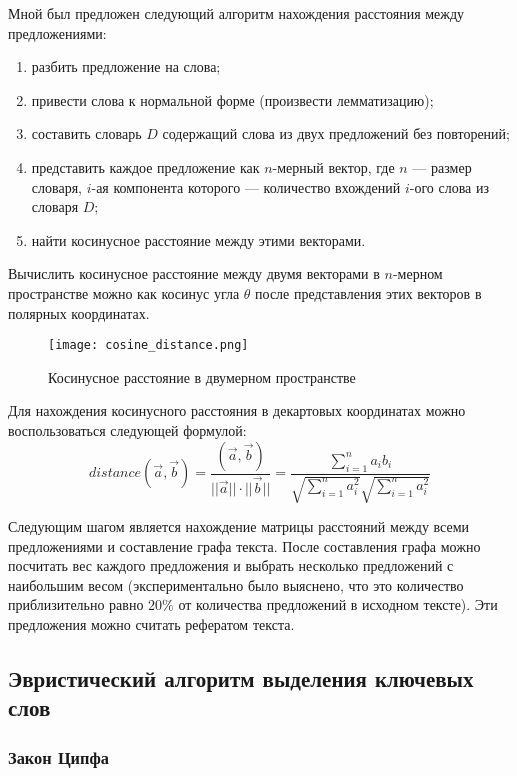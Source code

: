 Мной был предложен следующий алгоритм нахождения расстояния между предложениями:
\begin{enumerate}
    \item разбить предложение на слова;
    \item привести слова к нормальной форме (произвести лемматизацию);
    \item составить словарь $D$ содержащий слова из двух предложений без повторений;
    \item представить каждое предложение как $n$-мерный вектор, где $n$ --- размер словаря, $i$-ая компонента которого --- количество вхождений $i$-ого слова из словаря $D$;
    \item найти косинусное расстояние между этими векторами.
\end{enumerate} 

Вычислить косинусное расстояние между двумя векторами в $n$-мерном пространстве можно как косинус угла $\theta$ после представления этих векторов в полярных координатах.

\begin{figure}[H]
\centering
\texttt{[image: cosine\_distance.png]}
\caption{Косинусное расстояние в двумерном пространстве}
\label{fig:cosine}
\end{figure}

Для нахождения косинусного расстояния в декартовых координатах можно воспользоваться следующей формулой:
\begin{equation}
distance(\vec{a}, \vec{b}) = \dfrac{(\vec{a}, \vec{b})}{||\vec{a}|| \cdot ||\vec{b}||} = \dfrac{\sum\limits_{i=1}^{n}a_i b_i}{\sqrt{\sum\limits_{i=1}^{n} a_i^2}\sqrt{\sum\limits_{i=1}^{n} a_i^2}}
\end{equation}

Следующим шагом является нахождение матрицы расстояний между всеми предложениями и составление графа текста. После составления графа можно посчитать вес каждого предложения и выбрать несколько предложений с наибольшим весом (экспериментально было выяснено, что это количество приблизительно равно $20\%$ от количества предложений в исходном тексте). Эти предложения можно считать рефератом текста.

\subsection{Эвристический алгоритм выделения ключевых слов}

\subsubsection{Закон Ципфа}

